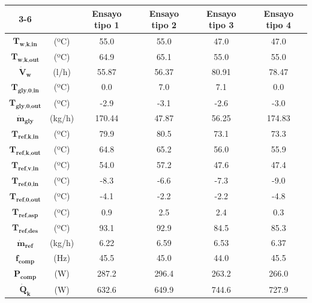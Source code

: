 \documentclass[../main.tex]{subfiles}
\begin{document}
\begin{table}[ht]
\centering
\begin{tabular}{cc|c|c|c|c|}
\cline{3-6}
 & & \textbf{Ensayo tipo 1} & \textbf{Ensayo tipo 2} & \textbf{Ensayo tipo 3} & \textbf{Ensayo tipo 4} \\
\hline
\multicolumn{1}{|c}{$\textbf{T}_\textbf{w,k,in}$} & (ºC) & 55.0 & 55.0 & 47.0 & 47.0 \\
\hline
\multicolumn{1}{|c}{$\textbf{T}_\textbf{w,k,out}$} & (ºC) & 64.9 & 65.1 & 55.0 & 55.0 \\
\hline
\multicolumn{1}{|c}{$\dot{\textbf{V}}_\textbf{w}$} & (l/h) & 55.87 & 56.37 & 80.91 & 78.47 \\
\hline
\multicolumn{1}{|c}{$\textbf{T}_\textbf{gly,0,in}$} & (ºC) & 0.0 & 7.0 & 7.1 & 0.0 \\
\hline
\multicolumn{1}{|c}{$\textbf{T}_\textbf{gly,0,out}$} & (ºC) & -2.9 & -3.1 & -2.6 & -3.0 \\
\hline
\multicolumn{1}{|c}{$\dot{\textbf{m}}_\textbf{gly}$} & (kg/h) & 170.44 & 47.87 & 56.25 & 174.83 \\
\hline
\multicolumn{1}{|c}{$\textbf{T}_\textbf{ref,k,in}$} & (ºC) & 79.9 & 80.5 & 73.1 & 73.3 \\
\hline
\multicolumn{1}{|c}{$\textbf{T}_\textbf{ref,k,out}$} & (ºC) & 64.8 & 65.2 & 56.0 & 55.9 \\
\hline
\multicolumn{1}{|c}{$\textbf{T}_\textbf{ref,v,in}$} & (ºC) & 54.0 & 57.2 & 47.6 & 47.4 \\
\hline
\multicolumn{1}{|c}{$\textbf{T}_\textbf{ref,0,in}$} & (ºC) & -8.3 & -6.6 & -7.3 & -9.0 \\
\hline
\multicolumn{1}{|c}{$\textbf{T}_\textbf{ref,0,out}$} & (ºC) & -4.1 & -2.2 & -2.2 & -4.8 \\
\hline
\multicolumn{1}{|c}{$\textbf{T}_\textbf{ref,asp}$} & (ºC) & 0.9 & 2.5 & 2.4 & 0.3 \\
\hline
\multicolumn{1}{|c}{$\textbf{T}_\textbf{ref,des}$} & (ºC) & 93.1 & 92.9 & 84.5 & 85.3 \\
\hline
\multicolumn{1}{|c}{$\dot{\textbf{m}}_\textbf{ref}$} & (kg/h) & 6.22 & 6.59 & 6.53 & 6.37 \\
\hline
\multicolumn{1}{|c}{$\textbf{f}_\textbf{comp}$} & (Hz) & 45.5 & 45.0 & 44.0 & 45.5 \\
\hline
\multicolumn{1}{|c}{$\textbf{P}_\textbf{comp}$} & (W) & 287.2 & 296.4 & 263.2 & 266.0 \\
\hline
\multicolumn{1}{|c}{$\dot{\textbf{Q}}_\textbf{k}$} & (W) & 632.6 & 649.9 & 744.6 & 727.9 \\

\end{tabular}
\end{table}
\end{document}
